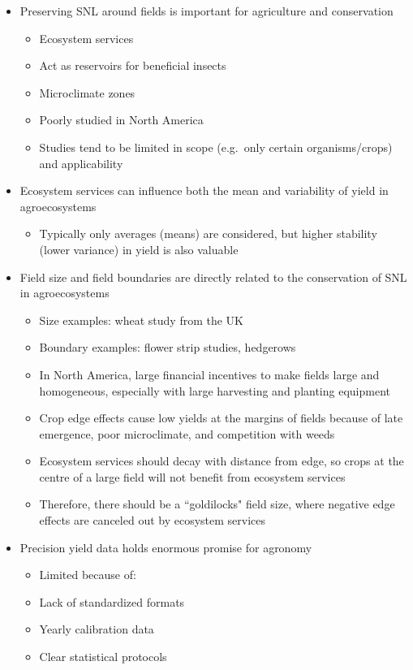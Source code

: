 \documentclass[]{elsarticle} %
\providecommand{\tightlist}{%
  \setlength{\itemsep}{0pt}\setlength{\parskip}{0pt}}
\begin{document}
\begin{itemize}
\tightlist
\item
  Preserving SNL around fields is important for agriculture and conservation

  \begin{itemize}
  \tightlist
  \item
    Ecosystem services
  \item
    Act as reservoirs for beneficial insects
  \item
    Microclimate zones
  \item
    Poorly studied in North America
  \item
    Studies tend to be limited in scope (e.g.~only certain organisms/crops) and applicability
  \end{itemize}
\item
  Ecosystem services can influence both the mean and variability of yield in agroecosystems

  \begin{itemize}
  \tightlist
  \item
    Typically only averages (means) are considered, but higher stability (lower variance) in yield is also valuable
  \end{itemize}
\item
  Field size and field boundaries are directly related to the conservation of SNL in agroecosystems

  \begin{itemize}
  \tightlist
  \item
    Size examples: wheat study from the UK
  \item
    Boundary examples: flower strip studies, hedgerows
  \item
    In North America, large financial incentives to make fields large and homogeneous, especially with large harvesting and planting equipment
  \item
    Crop edge effects cause low yields at the margins of fields because of late emergence, poor microclimate, and competition with weeds
  \item
    Ecosystem services should decay with distance from edge, so crops at the centre of a large field will not benefit from ecosystem services
  \item
    Therefore, there should be a ``goldilocks" field size, where negative edge effects are canceled out by ecosystem services
  \end{itemize}
\item
  Precision yield data holds enormous promise for agronomy

  \begin{itemize}
  \tightlist
  \item
    Limited because of:
  \item
    Lack of standardized formats
  \item
    Yearly calibration data
  \item
    Clear statistical protocols
  \end{itemize}
\end{itemize}
\end{document}
